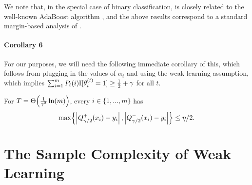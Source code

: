We note that, in the special case of binary classification, 
is closely related to the well-known AdaBoost algorithm
\citep{FreundSchapire97}, 
and the above results correspond to a
standard
margin-based analysis of
\citet{MR1673273}.

    


\paragraph{Corollary 6} %

For our purposes, we will need the following immediate corollary of this, 
which follows from plugging in the values of $\alpha_{t}$ and using the weak learning assumption, 
which implies $\sum_{i=1}^{m} P_{t}(i) \mathbb{I}[ \theta_{i}^{(t)} = 1 ] \geq \frac{1}{2} + \gamma$ for all $t$.

\begin{corollary}
\label{cor:kegl-T-size}
For $T = \Theta\!\left(\frac{1}{\gamma^{2}} \ln(m)\right)$, 
every $i \in \{1,\ldots,m\}$ has 
\begin{equation*}
\max\!\left\{ \left| Q_{\gamma/2}^{+}(x_{i}) - y_{i} \right|, \left| Q_{\gamma/2}^{-}(x_{i}) - y_{i} \right| \right\} \leq \eta/2.
\end{equation*}
\end{corollary}


    


\section{The Sample Complexity of Weak Learning}

\label{subsec:weak-learning}

